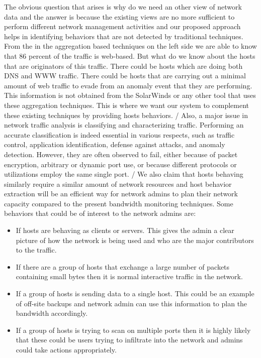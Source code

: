 The obvious question that arises is why do we need an other view of network data and the answer is because the existing views are no more sufficient to perform different network management activities and our proposed approach helps in identifying behaviors that are not detected by traditional techniques. From the  in the aggregation based techniques on the left side we are able to know that 86 percent of the traffic is web-based. But what do we know about the hosts that are originators of this traffic. There could be hosts which are doing both DNS and WWW traffic. There could be hosts that are carrying out a minimal amount of web traffic to evade from an anomaly event that they are performing. This information is not obtained from the SolarWinds or any other tool that uses these aggregation techniques. This is where we want our system to complement these existing techniques by providing hosts behaviors.
/
 Also, a major issue in network traffic analysis is classifying and characterizing traffic. Performing an accurate classification is indeed essential in various respects, such as traffic control, application identification, defense against attacks, and anomaly detection. However, they are often observed to fail, either because of packet encryption, arbitrary or dynamic port use, or because different protocols or utilizations employ the same single port.
 /
We also claim that hosts behaving similarly require a similar amount of network resources and host behavior extraction will be an efficient way for network admins to plan their network capacity compared to the present bandwidth monitoring techniques. Some behaviors that could be of interest to the network admins are:


\begin{itemize}
	\item If hosts are behaving as clients or servers. This gives the admin a clear picture of how the network is being used and who are the major contributors to the traffic.
	\item If there are a group of hosts that exchange a large number of packets containing small bytes then it is normal interactive traffic in the network.	
	\item If a group of hosts is sending data to a single host. This could be an example of off-site backups and network admin can use this information to plan the bandwidth accordingly.
	\item If a group of hosts is trying to scan on multiple ports then it is highly likely that these could be users trying to infiltrate into the network and admins could take actions appropriately.
	
\end{itemize}



